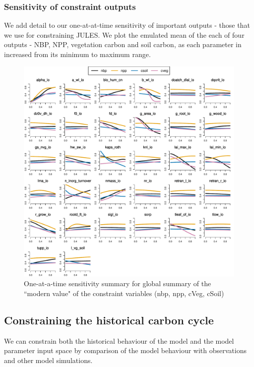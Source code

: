 \documentclass[gmd, manuscript]{copernicus}
\begin{document}
\subsubsection{Sensitivity of constraint outputs}

We add detail to our one-at-at-time sensitivity of important outputs - those that we use for constraining JULES. We plot the emulated mean of the each of four outputs - NBP, NPP, vegetation carbon and soil carbon, as each parameter in increased from its minimum to maximum range.

\begin{figure}[t]
\includegraphics[width=12cm]{./graphics/Y_oaat_const_level1a_scaled_norm}
\caption{One-at-a-time sensitivity summary for global summary of the ``modern value" of the constraint variables (nbp, npp, cVeg, cSoil)}
\label{fig:Y_oaat_const_level1a_scaled_norm}
\end{figure}



\subsection{Constraining the historical carbon cycle}

We can constrain both the historical behaviour of the model and the model parameter input space by comparison of the model behaviour with observations and other model simulations.
\end{document}
